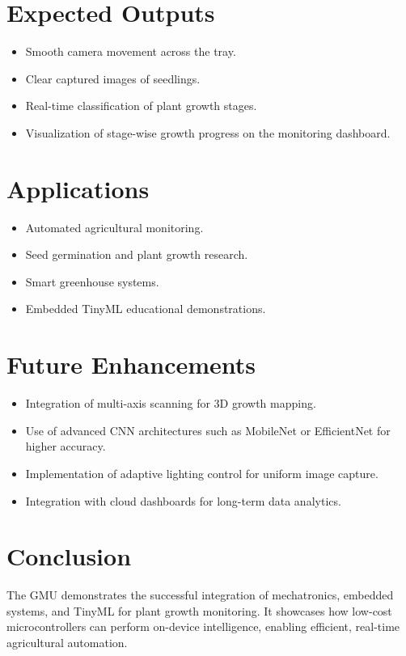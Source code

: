 \documentclass[../main]{subfiles}
\begin{document}
\section{Expected Outputs}
\begin{itemize}
    \item Smooth camera movement across the tray.
    \item Clear captured images of seedlings.
    \item Real-time classification of plant growth stages.
    \item Visualization of stage-wise growth progress on the monitoring dashboard.
\end{itemize}

\section{Applications}
\begin{itemize}
    \item Automated agricultural monitoring.
    \item Seed germination and plant growth research.
    \item Smart greenhouse systems.
    \item Embedded TinyML educational demonstrations.
\end{itemize}

\section{Future Enhancements}
\begin{itemize}
    \item Integration of multi-axis scanning for 3D growth mapping.
    \item Use of advanced CNN architectures such as MobileNet or EfficientNet for higher accuracy.
    \item Implementation of adaptive lighting control for uniform image capture.
    \item Integration with cloud dashboards for long-term data analytics.
\end{itemize}

\section{Conclusion}
The GMU demonstrates the successful integration of mechatronics, embedded systems, and TinyML for plant growth monitoring. It showcases how low-cost microcontrollers can perform on-device intelligence, enabling efficient, real-time agricultural automation.
\end{document}
